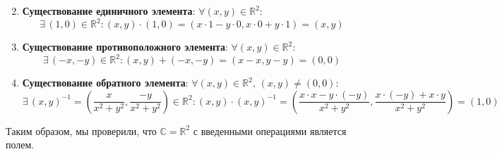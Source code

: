 \documentclass[12pt]{article}
\newcommand{\MR}{\mathbb{R}}
\newcommand{\MC}{\mathbb{C}}
\theoremstyle{definition}
\begin{document}
\begin{enumerate}[label=\arabic*)]
$$	$$
	\item \textbf{Существование единичного элемента}: $\forall (x,y) \in \MR^2$:
	$$
		\exists\, (1,0) \in \MR^2 \colon  (x,y){\cdot}(1,0) = (x{\cdot}1 - y{\cdot}0, x{\cdot}0 + y{\cdot}1) = (x,y)
	$$
	\item \textbf{Существование противоположного элемента}: $\forall (x,y) \in \MR^2$:
	$$
		\exists \, (-x,-y) \in \MR^2 \colon (x,y) + (-x,-y) = (x - x,y -y) = (0,0)
	$$
	\item \textbf{Существование обратного элемента}: $\forall (x,y) \in \MR^2, \, (x,y) \neq (0,0)$:
	$$
		\exists \, (x,y)^{-1} = \left(\dfrac{x}{x^2 + y^2}, \dfrac{-y}{x^2+y^2}\right)\in \MR^2 \colon (x,y){\cdot}(x,y)^{-1} = \left(\dfrac{x{\cdot}x - y{\cdot}(-y)}{x^2 + y^2},\dfrac{x{\cdot}(-y) + x{\cdot}y}{x^2 + y^2}   \right) = (1,0)
	$$
\end{enumerate}
Таким образом, мы проверили, что $\MC = \MR^2$ с введенными операциями является полем.
\end{document}

